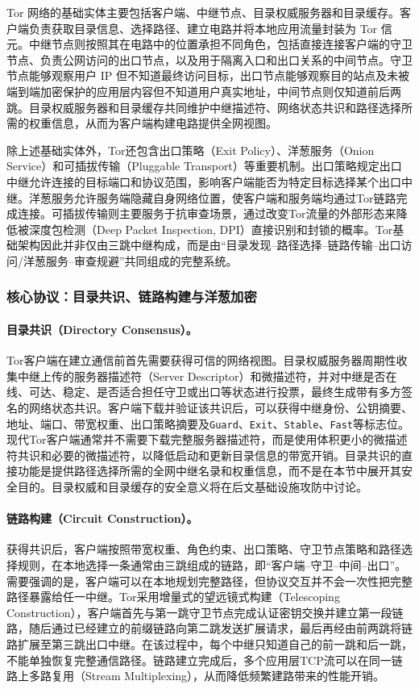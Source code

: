 Tor 网络的基础实体主要包括客户端、中继节点、目录权威服务器和目录缓存。客户端负责获取目录信息、选择路径、建立电路并将本地应用流量封装为 Tor 信元。中继节点则按照其在电路中的位置承担不同角色，包括直接连接客户端的守卫节点、负责公网访问的出口节点，以及用于隔离入口和出口关系的中间节点。守卫节点能够观察用户 IP 但不知道最终访问目标，出口节点能够观察目的站点及未被端到端加密保护的应用层内容但不知道用户真实地址，中间节点则仅知道前后两跳。目录权威服务器和目录缓存共同维护中继描述符、网络状态共识和路径选择所需的权重信息，从而为客户端构建电路提供全网视图\cite{torspec}。

除上述基础实体外，Tor还包含出口策略（Exit Policy）、洋葱服务（Onion Service）和可插拔传输（Pluggable Transport）等重要机制。出口策略规定出口中继允许连接的目标端口和协议范围，影响客户端能否为特定目标选择某个出口中继。洋葱服务允许服务端隐藏自身网络位置，使客户端和服务端均通过Tor链路完成连接。可插拔传输则主要服务于抗审查场景，通过改变Tor流量的外部形态来降低被深度包检测（Deep Packet Inspection, DPI）直接识别和封锁的概率。Tor基础架构因此并非仅由三跳中继构成，而是由“目录发现--路径选择--链路传输--出口访问/洋葱服务--审查规避”共同组成的完整系统。

\subsubsection{核心协议：目录共识、链路构建与洋葱加密}

\paragraph{目录共识（Directory Consensus）。}
Tor客户端在建立通信前首先需要获得可信的网络视图。目录权威服务器周期性收集中继上传的服务器描述符（Server Descriptor）和微描述符，并对中继是否在线、可达、稳定、是否适合担任守卫或出口等状态进行投票，最终生成带有多方签名的网络状态共识\cite{torspec}。客户端下载并验证该共识后，可以获得中继身份、公钥摘要、地址、端口、带宽权重、出口策略摘要及\texttt{Guard}、\texttt{Exit}、\texttt{Stable}、\texttt{Fast}等标志位。现代Tor客户端通常并不需要下载完整服务器描述符，而是使用体积更小的微描述符共识和必要的微描述符，以降低启动和更新目录信息的带宽开销。目录共识的直接功能是提供路径选择所需的全网中继名录和权重信息，而不是在本节中展开其安全目的。目录权威和目录缓存的安全意义将在后文基础设施攻防中讨论。

\paragraph{链路构建（Circuit Construction）。}
获得共识后，客户端按照带宽权重、角色约束、出口策略、守卫节点策略和路径选择规则，在本地选择一条通常由三跳组成的链路，即“客户端--守卫--中间--出口”。需要强调的是，客户端可以在本地规划完整路径，但协议交互并不会一次性把完整路径暴露给任一中继。Tor采用增量式的望远镜式构建（Telescoping Construction），客户端首先与第一跳守卫节点完成认证密钥交换并建立第一段链路，随后通过已经建立的前缀链路向第二跳发送扩展请求，最后再经由前两跳将链路扩展至第三跳出口中继\cite{dingledine2004tor,torspec}。在该过程中，每个中继只知道自己的前一跳和后一跳，不能单独恢复完整通信路径。链路建立完成后，多个应用层TCP流可以在同一链路上多路复用（Stream Multiplexing），从而降低频繁建路带来的性能开销。

